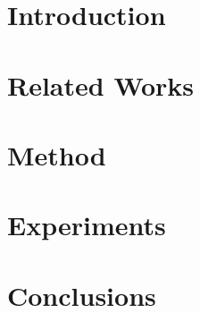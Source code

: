 \documentclass[final]{cvpr}
\begin{document}


\section{Introduction}
\label{sec:introduction}


\section{Related Works}
\label{sec:related}


\vspace{-0.1in}
\section{Method}
\label{sec:method}


\vspace{-0.1in}
\section{Experiments}
\label{sec:experiments}

\section{Conclusions}
\label{sec:conclusions}


\clearpage
{\small


}
\end{document}
